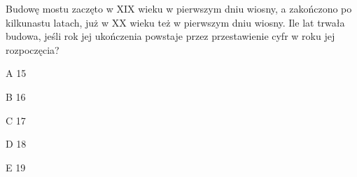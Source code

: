 \begin{tresc}
Budowę mostu zaczęto w XIX wieku w pierwszym dniu wiosny, a zakończono po kilkunastu latach, już w XX wieku też w pierwszym dniu wiosny. Ile lat trwała budowa, jeśli rok jej ukończenia powstaje przez przestawienie cyfr w roku jej rozpoczęcia?
\end{tresc}
\begin{wariant}{A} 15 \end{wariant}
\begin{wariant}{B} 16 \end{wariant}
\begin{wariant}{C} 17 \end{wariant}
\begin{wariant}{D} 18 \end{wariant}
\begin{wariant}{E} 19 \end{wariant}
